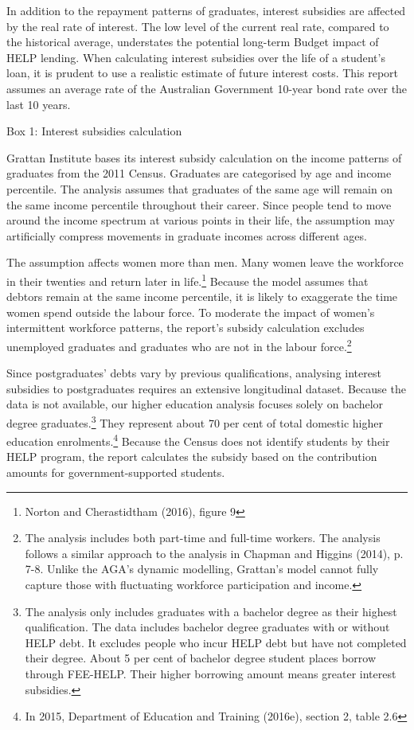 \documentclass[]{book}
\begin{document}
In addition to the repayment patterns of graduates, interest subsidies are affected by the real rate of interest. The low level of the current real rate, compared to the historical average, understates the potential long-term Budget impact of HELP lending. When calculating interest subsidies over the life of a student's loan, it is prudent to use a realistic estimate of future interest costs. This report assumes an average rate of the Australian Government 10-year bond rate over the last 10 years.

\protect\hypertarget{_Ref335551295}{}{}Box 1: Interest subsidies calculation

Grattan Institute bases its interest subsidy calculation on the income patterns of graduates from the 2011 Census. Graduates are categorised by age and income percentile. The analysis assumes that graduates of the same age will remain on the same income percentile throughout their career. Since people tend to move around the income spectrum at various points in their life, the assumption may artificially compress movements in graduate incomes across different ages.

The assumption affects women more than men. Many women leave the workforce in their twenties and return later in life.\footnote{Norton and Cherastidtham (2016), figure 9} Because the model assumes that debtors remain at the same income percentile, it is likely to exaggerate the time women spend outside the labour force. To moderate the impact of women's intermittent workforce patterns, the report's subsidy calculation excludes unemployed graduates and graduates who are not in the labour force.\footnote{The analysis includes both part-time and full-time workers. The analysis follows a similar approach to the analysis in Chapman and Higgins (2014), p. 7-8. Unlike the AGA's dynamic modelling, Grattan's model cannot fully capture those with fluctuating workforce participation and income.}

Since postgraduates' debts vary by previous qualifications, analysing interest subsidies to postgraduates requires an extensive longitudinal dataset. Because the data is not available, our higher education analysis focuses solely on bachelor degree graduates.\footnote{The analysis only includes graduates with a bachelor degree as their highest qualification. The data includes bachelor degree graduates with or without HELP debt. It excludes people who incur HELP debt but have not completed their degree. About 5 per cent of bachelor degree student places borrow through FEE-HELP. Their higher borrowing amount means greater interest subsidies.} They represent about 70 per cent of total domestic higher education enrolments.\footnote{In 2015, Department of Education and Training (2016e), section 2, table 2.6} Because the Census does not identify students by their HELP program, the report calculates the subsidy based on the contribution amounts for government-supported students.
\end{document}
